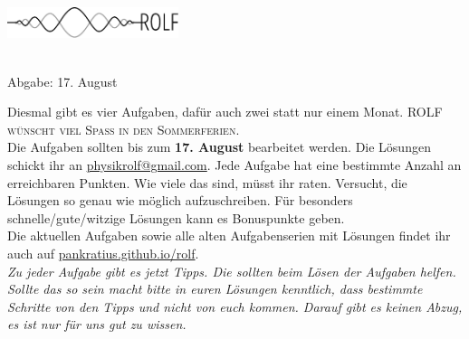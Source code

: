 \documentclass[a4paper]{article}
\begin{document}
	\vspace*{-1cm}
	\parbox{4cm}{\vspace{-0.2cm}\includegraphics[width=5cm]{../images/logo_scaled.pdf}}
	\parbox{10.6cm}{ \\
			Abgabe: 17. August \\ \vspace*{-.5cm} }
		\vspace{0.5cm}

		
		\thispagestyle{empty}
\begin{framed}
	\noindent
	\scriptsize
	Diesmal gibt es vier Aufgaben, dafür auch zwei statt nur einem Monat. \textsc{ROLF wünscht viel Spaß in den Sommerferien.}\\
	Die Aufgaben sollten bis zum \textbf{17. August} bearbeitet werden. Die Lösungen schickt ihr an \href{mailto:physikrolf@gmail.com}{physikrolf@gmail.com}.
	Jede Aufgabe hat eine bestimmte Anzahl an erreichbaren Punkten. Wie viele das sind, müsst ihr raten. Versucht, die Lösungen so genau wie möglich aufzuschreiben. Für besonders schnelle/gute/witzige Lösungen kann es Bonuspunkte geben.\\ Die aktuellen Aufgaben sowie alle alten Aufgabenserien mit Lösungen findet ihr auch auf \url{pankratius.github.io/rolf}. \\\textit{Zu jeder Aufgabe gibt es jetzt Tipps. Die sollten beim Lösen der Aufgaben helfen.\\ Sollte das so sein macht bitte in euren Lösungen kenntlich, dass bestimmte Schritte von den Tipps und nicht von euch kommen. Darauf gibt es keinen Abzug, es ist nur für uns gut zu wissen.}
\end{framed}

\noindent
\end{document}
